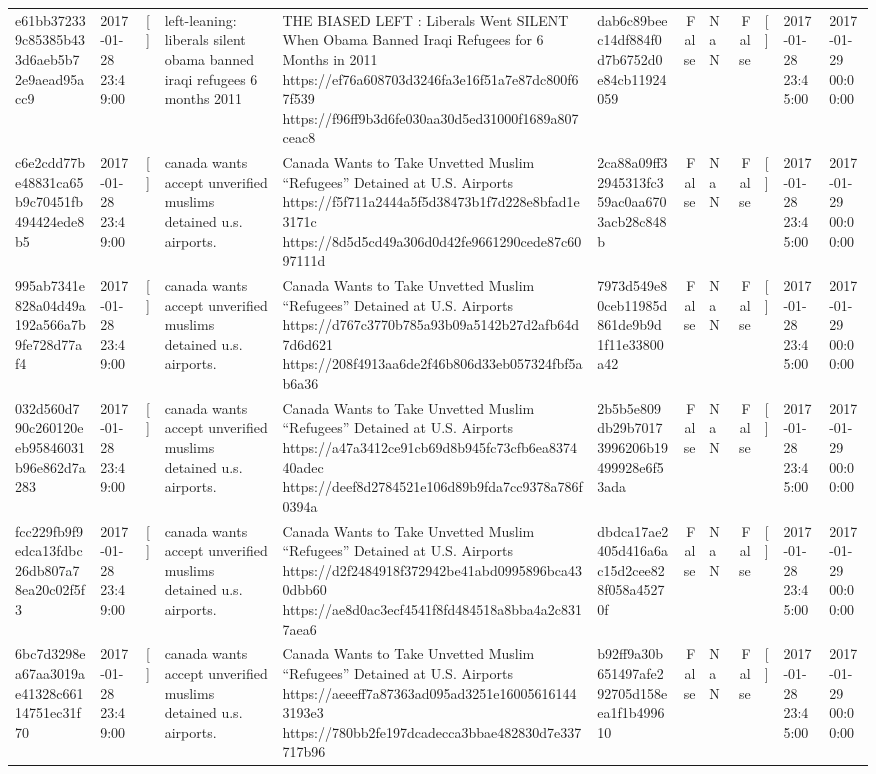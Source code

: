 \begin{tabular}{llllllrlrlll}
e61bb372339c85385b433d6aeb5b72e9aead95acc9 & 2017-01-28 23:49:00 & [] & left-leaning: liberals silent obama banned iraqi refugees 6 months 2011 & THE BIASED LEFT : Liberals Went SILENT When Obama Banned Iraqi Refugees for 6 Months in 2011 https://ef76a608703d3246fa3e16f51a7e87dc800f67f539 https://f96ff9b3d6fe030aa30d5ed31000f1689a807ceac8 & dab6c89beec14df884f0d7b6752d0e84cb11924059 & False & NaN & False & [] & 2017-01-28 23:45:00 & 2017-01-29 00:00:00 \\
c6e2cdd77be48831ca65b9c70451fb494424ede8b5 & 2017-01-28 23:49:00 & [] & canada wants accept unverified muslims detained u.s. airports. & Canada Wants to Take Unvetted Muslim “Refugees” Detained at U.S. Airports https://f5f711a2444a5f5d38473b1f7d228e8bfad1e3171c https://8d5d5cd49a306d0d42fe9661290cede87c6097111d & 2ca88a09ff32945313fc359ac0aa6703acb28c848b & False & NaN & False & [] & 2017-01-28 23:45:00 & 2017-01-29 00:00:00 \\
995ab7341e828a04d49a192a566a7b9fe728d77af4 & 2017-01-28 23:49:00 & [] & canada wants accept unverified muslims detained u.s. airports. & Canada Wants to Take Unvetted Muslim “Refugees” Detained at U.S. Airports https://d767c3770b785a93b09a5142b27d2afb64d7d6d621 https://208f4913aa6de2f46b806d33eb057324fbf5ab6a36 & 7973d549e80ceb11985d861de9b9d1f11e33800a42 & False & NaN & False & [] & 2017-01-28 23:45:00 & 2017-01-29 00:00:00 \\
032d560d790c260120eeb95846031b96e862d7a283 & 2017-01-28 23:49:00 & [] & canada wants accept unverified muslims detained u.s. airports. & Canada Wants to Take Unvetted Muslim “Refugees” Detained at U.S. Airports https://a47a3412ce91cb69d8b945fc73cfb6ea837440adec https://deef8d2784521e106d89b9fda7cc9378a786f0394a & 2b5b5e809db29b70173996206b19499928e6f53ada & False & NaN & False & [] & 2017-01-28 23:45:00 & 2017-01-29 00:00:00 \\
fcc229fb9f9edca13fdbc26db807a78ea20c02f5f3 & 2017-01-28 23:49:00 & [] & canada wants accept unverified muslims detained u.s. airports. & Canada Wants to Take Unvetted Muslim “Refugees” Detained at U.S. Airports https://d2f2484918f372942be41abd0995896bca430dbb60 https://ae8d0ac3ecf4541f8fd484518a8bba4a2c8317aea6 & dbdca17ae2405d416a6ac15d2cee828f058a45270f & False & NaN & False & [] & 2017-01-28 23:45:00 & 2017-01-29 00:00:00 \\
6bc7d3298ea67aa3019ae41328c66114751ec31f70 & 2017-01-28 23:49:00 & [] & canada wants accept unverified muslims detained u.s. airports. & Canada Wants to Take Unvetted Muslim “Refugees” Detained at U.S. Airports https://aeeeff7a87363ad095ad3251e160056161443193e3 https://780bb2fe197dcadecca3bbae482830d7e337717b96 & b92ff9a30b651497afe292705d158eea1f1b499610 & False & NaN & False & [] & 2017-01-28 23:45:00 & 2017-01-29 00:00:00 \\

\end{tabular}
